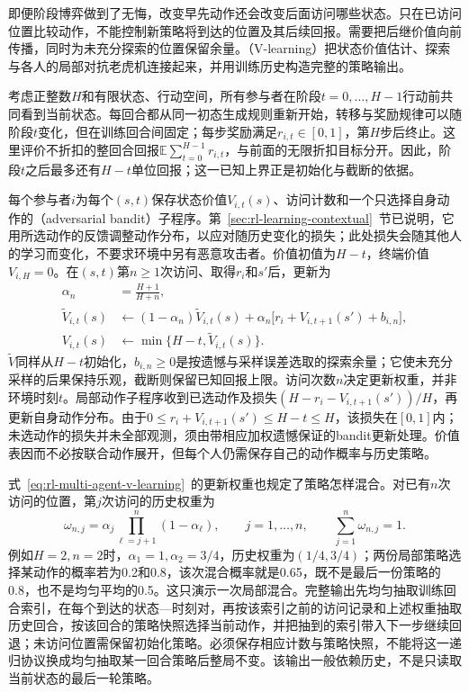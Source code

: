 即便阶段博弈做到了无悔，改变早先动作还会改变后面访问哪些状态。只在已访问位置比较动作，不能控制新策略将到达的位置及其后续回报。需要把后继价值向前传播，同时为未充分探索的位置保留余量。（V-learning）把状态价值估计、探索与各人的局部对抗老虎机连接起来，并用训练历史构造完整的策略输出。

考虑正整数$H$和有限状态、行动空间，所有参与者在阶段$t=0,\ldots,H-1$行动前共同看到当前状态。每回合都从同一初态生成规则重新开始，转移与奖励规律可以随阶段$t$变化，但在训练回合间固定；每步奖励满足$r_{i,t}\in[0,1]$，第$H$步后终止。这里评价不折扣的整回合回报$\mathbb E\sum_{t=0}^{H-1}r_{i,t}$，与前面的无限折扣目标分开。因此，阶段$t$之后最多还有$H-t$单位回报；这一已知上界正是初始化与截断的依据。

每个参与者$i$为每个$(s,t)$保存状态价值$V_{i,t}(s)$、访问计数和一个只选择自身动作的（adversarial bandit）子程序。第~\ref{sec:rl-learning-contextual}~节已说明，它用所选动作的反馈调整动作分布，以应对随历史变化的损失；此处损失会随其他人的学习而变化，不要求环境中另有恶意攻击者。价值初值为$H-t$，终端价值$V_{i,H}=0$。在$(s,t)$第$n\geq1$次访问、取得$r_i$和$s'$后，更新为
\begin{equation}
 \begin{aligned}
  \alpha_n&=\frac{H+1}{H+n},\\
  \widetilde V_{i,t}(s)&\leftarrow
      (1-\alpha_n)\widetilde V_{i,t}(s)
      +\alpha_n\bigl[r_i+V_{i,t+1}(s')+b_{i,n}\bigr],\\
  V_{i,t}(s)&\leftarrow\min\{H-t,\widetilde V_{i,t}(s)\}.
 \end{aligned}
 \label{eq:rl-multi-agent-v-learning}
\end{equation}
$\widetilde V$同样从$H-t$初始化，$b_{i,n}\geq0$是按遗憾与采样误差选取的探索余量；它使未充分采样的后果保持乐观，截断则保留已知回报上限。访问次数$n$决定更新权重，并非环境时刻$t$。局部动作子程序收到已选动作及损失$(H-r_i-V_{i,t+1}(s'))/H$，再更新自身动作分布。由于$0\leq r_i+V_{i,t+1}(s')\leq H-t\leq H$，该损失在$[0,1]$内；未选动作的损失并未全部观测，须由带相应加权遗憾保证的bandit更新处理。价值表因而不必按联合动作展开，但每个人仍需保存自己的动作概率与历史策略。

式~\eqref{eq:rl-multi-agent-v-learning}~的更新权重也规定了策略怎样混合。对已有$n$次访问的位置，第$j$次访问的历史权重为
\[
 \omega_{n,j}=\alpha_j\prod_{\ell=j+1}^{n}(1-\alpha_\ell),
 \qquad j=1,\ldots,n,\qquad\sum_{j=1}^n\omega_{n,j}=1.
\]
例如$H=2,n=2$时，$\alpha_1=1,\alpha_2=3/4$，历史权重为$(1/4,3/4)$；两份局部策略选择某动作的概率若为0.2和0.8，该次混合概率就是0.65，既不是最后一份策略的0.8，也不是均匀平均的0.5。这只演示一次局部混合。完整输出先均匀抽取训练回合索引，在每个到达的状态—时刻对，再按该索引之前的访问记录和上述权重抽取历史回合，按该回合的策略快照选择当前动作，并把抽到的索引带入下一步继续回退；未访问位置需保留初始化策略。必须保存相应计数与策略快照，不能将这一递归协议换成均匀抽取某一回合策略后整局不变。该输出一般依赖历史，不是只读取当前状态的最后一轮策略。

